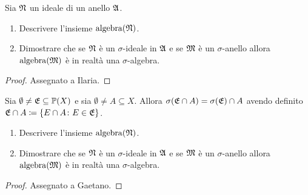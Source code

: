 \documentclass[../EserciziIstituzioniAnalisi.tex]{subfiles}
\begin{document}
\begin{exercise}[13/10/2016]
Sia $\mathfrak N$ un ideale di un anello $\mathfrak A$.
\begin{enumerate}
\item Descrivere l'insieme $\operatorname{algebra}(\mathfrak N)$.
\item Dimostrare che se $\mathfrak N$ è un $\sigma$-ideale in $\mathfrak A$ e se $\mathfrak M$ è un $\sigma$-anello allora $\operatorname{algebra}(\mathfrak M)$ è in realtà una $\sigma$-algebra.
\end{enumerate}
\end{exercise}
\begin{proof}
  Assegnato a Ilaria.
\end{proof}

\begin{exercise}[2016-10-13]
Sia $\emptyset \neq \mathfrak E \subseteq \mathbb P(X)$ e sia $\emptyset \neq A \subseteq X$.
Allora $\sigma(\mathfrak E \cap A) = \sigma(\mathfrak E) \cap A$ avendo definito $\mathfrak E \cap A \coloneqq \left\lbrace E \cap A \colon E \in \mathfrak E\right\rbrace$.
\begin{enumerate}
\item Descrivere l'insieme $\operatorname{algebra}(\mathfrak N)$.
\item Dimostrare che se $\mathfrak N$ è un $\sigma$-ideale in $\mathfrak A$ e se $\mathfrak M$ è un $\sigma$-anello allora $\operatorname{algebra}(\mathfrak M)$ è in realtà una $\sigma$-algebra.
\end{enumerate}
\end{exercise}
\begin{proof}
Assegnato a Gaetano.
\end{proof}
\end{document}
